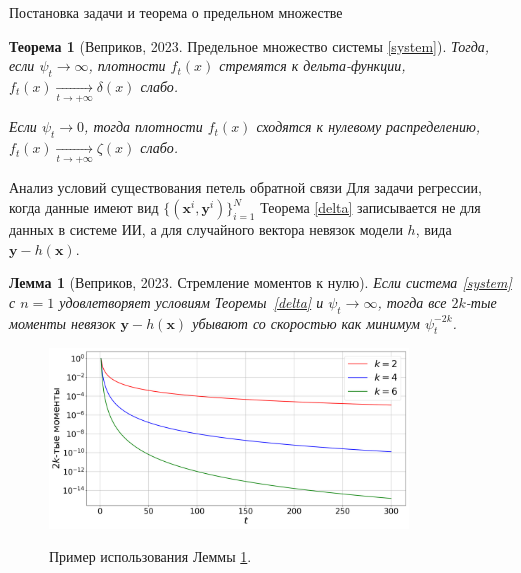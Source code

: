 \documentclass{beamer}
\newtheorem{theorem_rus}{Теорема}
\newtheorem{lemma_rus}{Лемма}
\begin{document}
\begin{frame}{Постановка задачи и теорема о предельном множестве}
\begin{theorem_rus}[Веприков, 2023. Предельное множество системы \eqref{system}]
        \color{black}Тогда, если $\psi_t \to \infty$, плотности $f_t(x)$ стремятся к дельта-функции, $f_t(x) \underset{t \to +\infty}{\longrightarrow} \delta(x)$ слабо.  
    
        Если $\psi_t \to 0$, тогда плотности $f_t(x)$ сходятся к нулевому распределению, $f_t(x) \underset{t \to +\infty}{\longrightarrow} \zeta(x)$ слабо.
    \end{theorem_rus}
\end{frame}
\begin{frame}{Анализ условий существования петель обратной связи}
    \vspace{-1mm} 
    Для задачи регрессии, когда данные имеют вид $\{(\textbf{x}^i, \textbf{y}^i) \}_{i=1}^N$ Теорема \ref{delta} записывается не для данных в системе ИИ, а для случайного вектора невязок модели $h$, вида $\textbf{y} - h(\textbf{x})$.
    \vspace{-1mm}
    \begin{lemma_rus}[Веприков, 2023. Стремление моментов к нулю] \label{moments}
        Если система \eqref{system} с $n=1$ удовлетворяет условиям Теоремы~\ref{delta} и $\psi_t \to \infty$, тогда все $2k$-тые моменты невязок 
        $\textbf{y} - h(\textbf{x})$ убывают со скоростью как минимум $\psi_t^{-2k}$.
    \end{lemma_rus}
    \vspace{-2mm}
    \begin{figure}
        \centering
        \includegraphics[width=0.85\textwidth]{fig/fig2.png}
        \vspace{-3mm}
        
        Пример использования Леммы \ref{moments}.
    \end{figure}
\end{frame}
\end{document}

